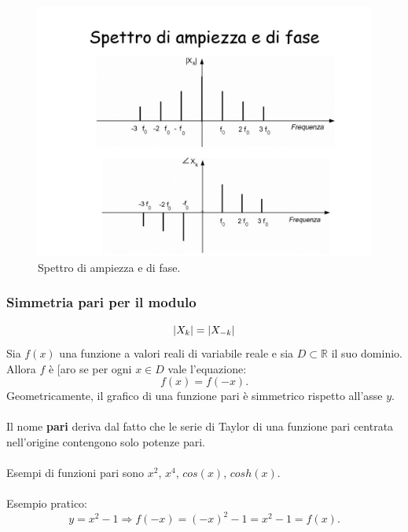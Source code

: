 \documentclass[12pt,oneside,openany]{memoir}
\numberwithin{equation}{subsection}
\DeclarePairedDelimiter{\abs}{\lvert}{\rvert}
\begin{document}
\begin{figure}
\centering
\captionsetup{justification=centering}
\includegraphics[width=1.0\textwidth]{images/spettro_di_ampiezza_e_di_fase.jpg}
\caption{Spettro di ampiezza e di fase.}
\end{figure}

\subsubsection{Simmetria pari per il modulo}
\begin{equation}
	\abs{X_k} = \abs{X_{-k}}
\end{equation}
Sia $f(x)$ una funzione a valori reali di variabile reale e sia $D \subset \mathbb{R}$ il suo dominio. Allora $f$ \`e [aro se per ogni $x \in D$ vale l'equazione:
\[
	f(x) = f(-x).
\]
Geometricamente, il grafico di una funzione pari \`e simmetrico rispetto all'asse $y$.\\
\\
Il nome \textbf{pari} deriva dal fatto che le serie di Taylor di una funzione pari centrata nell'origine contengono solo potenze pari.\\
\\
Esempi di funzioni pari sono $x^2$, $x^4$, $cos(x)$, $cosh(x)$.\\
\\
Esempio pratico:
\[
	y = x^2 - 1 \Longrightarrow f(-x) = (-x)^2 - 1 = x^2 - 1 = f(x).
\]
\end{document}
